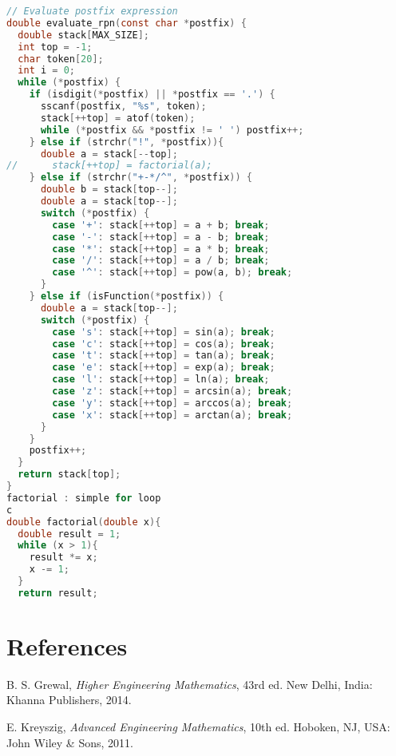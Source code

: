\documentclass[conference]{IEEEtran}
\begin{document}
\begin{lstlisting}[language=C, caption={Simplified Parser Implementation}]
// Evaluate postfix expression
double evaluate_rpn(const char *postfix) {
  double stack[MAX_SIZE];
  int top = -1;
  char token[20];
  int i = 0;
  while (*postfix) {
    if (isdigit(*postfix) || *postfix == '.') {
      sscanf(postfix, "%s", token);
      stack[++top] = atof(token);
      while (*postfix && *postfix != ' ') postfix++;
    } else if (strchr("!", *postfix)){
      double a = stack[--top];
//      stack[++top] = factorial(a);
    } else if (strchr("+-*/^", *postfix)) {
      double b = stack[top--];
      double a = stack[top--];
      switch (*postfix) {
        case '+': stack[++top] = a + b; break;
        case '-': stack[++top] = a - b; break;
        case '*': stack[++top] = a * b; break;
        case '/': stack[++top] = a / b; break;
        case '^': stack[++top] = pow(a, b); break;
      }
    } else if (isFunction(*postfix)) {
      double a = stack[top--];
      switch (*postfix) {
        case 's': stack[++top] = sin(a); break;
        case 'c': stack[++top] = cos(a); break;
        case 't': stack[++top] = tan(a); break;
        case 'e': stack[++top] = exp(a); break;
        case 'l': stack[++top] = ln(a); break;
        case 'z': stack[++top] = arcsin(a); break;
        case 'y': stack[++top] = arccos(a); break;
        case 'x': stack[++top] = arctan(a); break;
      }
    }
    postfix++;
  }
  return stack[top];
}
factorial : simple for loop
c
double factorial(double x){
  double result = 1;
  while (x > 1){
    result *= x;
    x -= 1;
  }
  return result;
\end{lstlisting}

\section*{References}
\begin{thebibliography}{00}

B. S. Grewal, \textit{Higher Engineering Mathematics}, 43rd ed. New Delhi, India: Khanna Publishers, 2014.

E. Kreyszig, \textit{Advanced Engineering Mathematics}, 10th ed. Hoboken, NJ, USA: John Wiley \& Sons, 2011.

\end{thebibliography}
\end{document}

